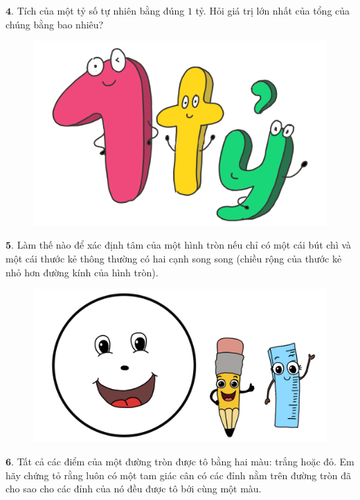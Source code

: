 \begin{multicols}{2}
\begin{figure}[H]
		\vspace*{-15pt}
	\end{figure}
	$\pmb{4.}$ Tích của một tỷ số tự nhiên bằng đúng $1$ tỷ. Hỏi giá trị lớn nhất của tổng của chúng bằng bao nhiêu?
	\begin{figure}[H]
		\centering
		\vspace*{5pt}
		\captionsetup{labelformat= empty, justification=centering}
		\includegraphics[width=1\linewidth]{bai5}
		\vspace*{-15pt}
	\end{figure}
	$\pmb{5.}$ Làm thế nào để xác định tâm của một hình tròn nếu chỉ có một cái bút chì và một cái thước kẻ thông thường có hai cạnh song song (chiều rộng của thước kẻ nhỏ hơn đường kính của hình tròn).
	\begin{figure}[H]
		\centering
		\vspace*{-5pt}
		\captionsetup{labelformat= empty, justification=centering}
		\includegraphics[width=1\linewidth]{bai4}
		\vspace*{-15pt}
	\end{figure}
	$\pmb{6.}$ Tất cả các điểm của một đường tròn được tô bằng hai màu: trắng hoặc đỏ. Em hãy chứng tỏ rằng luôn có một tam giác cân có các đỉnh nằm trên đường tròn đã cho sao cho các đỉnh của nó đều được tô bởi cùng một màu.

\end{multicols}
